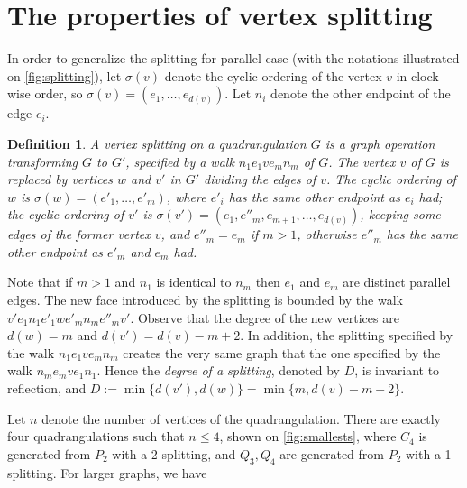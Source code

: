 \documentclass[]{article}
\newtheorem{defn}{Definition}
\newcommand{\sdeg}{m}
\begin{document}
\section{The properties of vertex splitting} \label{sec:splitting}



In order to generalize the splitting for parallel case (with the notations illustrated on \autoref{fig:splitting}), 
let $\sigma(v)$ denote the cyclic ordering of the vertex $v$ in clock-wise order, so $\sigma(v)=\left(e_1,\ldots,e_{d(v)}\right)$. Let $n_i$ denote the other endpoint of the edge $e_i$.
\begin{defn}
A \emph{vertex splitting} on a quadrangulation $G$ is a graph operation transforming $G$ to $G'$, specified by a walk $n_1e_1ve_mn_m$ of $G$.
The vertex $v$ of $G$ is replaced by vertices $w$ and $v'$ in $G'$ dividing the edges of $v$.
The cyclic ordering of $w$ is $\sigma(w)=(e'_1,\ldots,e'_\sdeg)$, where $e'_i$ has the same other endpoint as $e_i$ had;
the cyclic ordering of $v'$ is $\sigma(v')=(e_1,e''_\sdeg,e_{\sdeg+1},\ldots,e_{d(v)})$, keeping some edges of the former vertex $v$, and $e''_{\sdeg}=e_\sdeg$ if $\sdeg>1$, otherwise $e''_\sdeg$ has the same other endpoint as $e'_\sdeg$ and $e_\sdeg$ had.
\end{defn}

Note that if $m>1$ and $n_1$ is identical to $n_\sdeg$ then $e_1$ and $e_\sdeg$ are distinct parallel edges.
The new face introduced by the splitting is bounded by the walk $v'e_1n_1e'_1we'_mn_me''_mv'$.
Observe that the degree of the new vertices are $d(w)=\sdeg$ and $d(v')=d(v)-\sdeg+2$.
In addition, the splitting specified by the walk $n_1e_1ve_\sdeg n_\sdeg$ creates the very same graph that the one specified by the walk $n_\sdeg e_\sdeg ve_1 n_1$.
Hence the \emph{degree of a splitting}, denoted by $D$, is invariant to reflection, and $D:=\min\{d(v'),d(w)\}=\min\{m,d(v)-m+2\}$.

Let $n$ denote the number of vertices of the quadrangulation.
There are exactly four quadrangulations such that $n\leq 4$, shown on \autoref{fig:smallests}, where $C_4$ is generated from $P_2$ with a 2-splitting, and $Q_3,Q_4$ are generated from $P_2$ with a 1-splitting.
For larger graphs, we have
\end{document}
